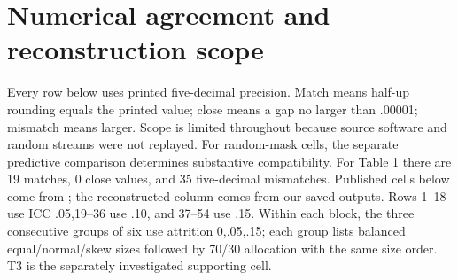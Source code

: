 \documentclass[11pt]{article}
\begin{document}
\section{Numerical agreement and reconstruction scope}
Every row below uses printed five-decimal precision. Match means half-up rounding equals the printed value; close means a gap no larger than .00001; mismatch means larger. Scope is limited throughout because source software and random streams were not replayed. For random-mask cells, the separate predictive comparison determines substantive compatibility. For Table 1 there are 19 matches, 0 close values, and 35 five-decimal mismatches.
Published cells below come from \citet[Table~1, p.~92; Table~3, p.~94]{kupzyk2011}; the reconstructed column comes from our saved outputs. Rows 1--18 use ICC .05,19--36 use .10, and 37--54 use .15. Within each block, the three consecutive groups of six use attrition 0,.05,.15; each group lists balanced equal/normal/skew sizes followed by 70/30 allocation with the same size order. T3 is the separately investigated supporting cell.
\end{document}
